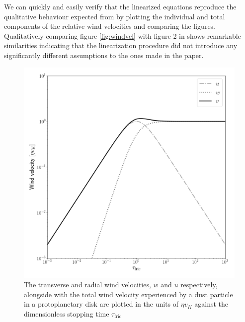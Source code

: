 \documentclass[12pt]{article}
\begin{document}
We can quickly and easily verify that the linearized equations reproduce the qualitative behaviour expected from \cite{Weidenschilling77} by plotting the individual and total components of the relative wind velocities and comparing the figures. Qualitatively comparing figure \ref{fig:windvel} with figure 2 in \cite{Weidenschilling77} shows remarkable similarities indicating that the linearization procedure did not introduce any significantly different assumptions to the ones made in the paper.
\begin{figure}[htbp]
    \label{fig:windvel}
    \centering
    \includegraphics[width=0.5\linewidth]{windvel}
    \caption{The transverse and radial wind velocities, $w$ and $u$ respectively, alongside with the total wind velocity experienced by a dust particle in a protoplanetary disk are plotted in the units of $\eta v_K$ against the dimensionless stopping time $\tau_\mathrm{fric}$ }
    \label{fig:my_label}
\end{figure}
\end{document}
